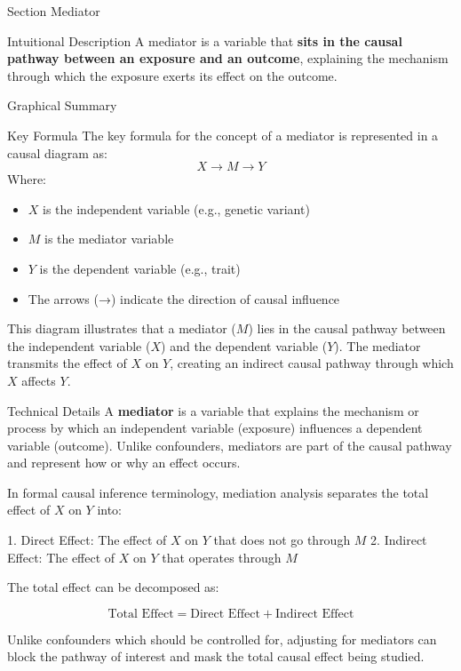 
\begin{frame}{Section}
\centering
\Huge{Mediator}
\end{frame}


\begin{frame}{Intuitional Description}
A mediator is a variable that \textbf{sits in the causal pathway between an exposure and an outcome}, explaining the mechanism through which the exposure exerts its effect on the outcome.
\end{frame}

\begin{frame}{Graphical Summary}

\end{frame}


\begin{frame}{Key Formula}
The key formula for the concept of a mediator is represented in a causal diagram as:
$$
X → M → Y
$$
Where:
\begin{itemize}
\item $X$ is the independent variable (e.g., genetic variant)
\item $M$ is the mediator variable
\item $Y$ is the dependent variable (e.g., trait)
\item The arrows (→) indicate the direction of causal influence
\end{itemize}

This diagram illustrates that a mediator ($M$) lies in the causal pathway between the independent variable ($X$) and the dependent variable ($Y$). The mediator transmits the effect of $X$ on $Y$, creating an indirect causal pathway through which $X$ affects $Y$.
\end{frame}


\begin{frame}{Technical Details}
A \textbf{mediator} is a variable that explains the mechanism or process by which an independent variable (exposure) influences a dependent variable (outcome). Unlike confounders, mediators are part of the causal pathway and represent how or why an effect occurs.

In formal causal inference terminology, mediation analysis separates the total effect of $X$ on $Y$ into:

1. Direct Effect: The effect of $X$ on $Y$ that does not go through $M$
2. Indirect Effect: The effect of $X$ on $Y$ that operates through $M$

The total effect can be decomposed as:

$$\text{Total Effect} = \text{Direct Effect} + \text{Indirect Effect}$$

Unlike confounders which should be controlled for, adjusting for mediators can block the pathway of interest and mask the total causal effect being studied.
\end{frame}

